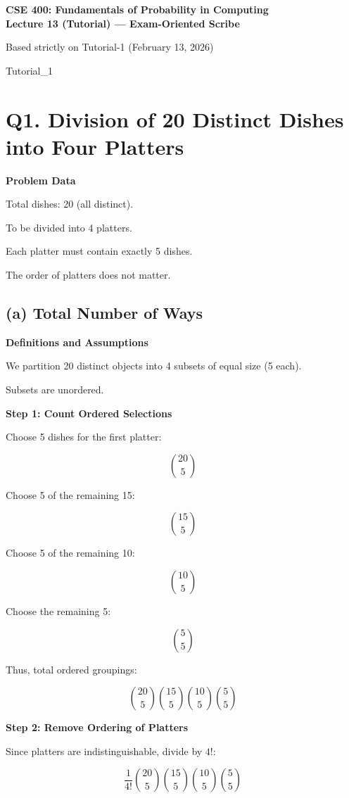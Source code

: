 \documentclass[11pt]{article}
\begin{document}
\begin{center}
\textbf{CSE 400: Fundamentals of Probability in Computing} \\
\textbf{Lecture 13 (Tutorial) — Exam-Oriented Scribe}
\end{center}

Based strictly on Tutorial-1 (February 13, 2026) 

Tutorial\_1

\section*{\textbf{Q1. Division of 20 Distinct Dishes into Four Platters}}

\textbf{Problem Data}

Total dishes: 20 (all distinct).

To be divided into 4 platters.

Each platter must contain exactly 5 dishes.

The order of platters does not matter.

\subsection*{\textbf{(a) Total Number of Ways}}

\textbf{Definitions and Assumptions}

We partition 20 distinct objects into 4 subsets of equal size (5 each).

Subsets are unordered.

\textbf{Step 1: Count Ordered Selections}

Choose 5 dishes for the first platter:

\[
\binom{20}{5}
\]

Choose 5 of the remaining 15:

\[
\binom{15}{5}
\]

Choose 5 of the remaining 10:

\[
\binom{10}{5}
\]

Choose the remaining 5:

\[
\binom{5}{5}
\]

Thus, total ordered groupings:

\[
\binom{20}{5}
\binom{15}{5}
\binom{10}{5}
\binom{5}{5}
\]

\textbf{Step 2: Remove Ordering of Platters}

Since platters are indistinguishable, divide by $4!$:

\[
\frac{1}{4!}
\binom{20}{5}
\binom{15}{5}
\binom{10}{5}
\binom{5}{5}
\]
\end{document}
